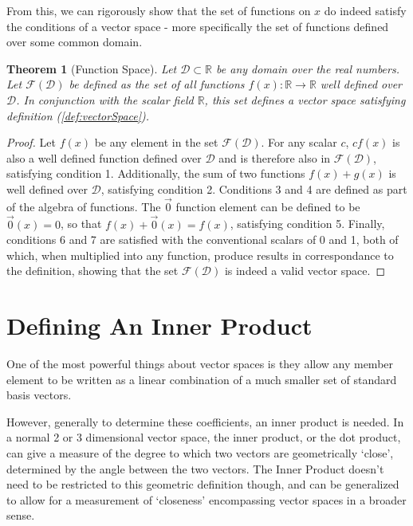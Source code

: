 \documentclass{article}
\newcommand*\R{\mathbb{R}}
\newtheorem{theorem}{Theorem}[section]
\theoremstyle{definition}
\theoremstyle{remark}
\begin{document}
From this, we can rigorously show that the set of functions
on $x$ do indeed satisfy the conditions of a vector space - more 
specifically the set of functions defined over some common domain.

\begin{theorem}[Function Space]
  Let $\mathcal{D} \subset \R$ be any domain over the real numbers. 
  Let $\mathscr{F}(\mathcal{D})$ be defined as the set of all functions $f(x) : \mathbb{R} \to \mathbb{R}$ well defined over $\mathcal{D}$. 
  In conjunction with the scalar field $\R$, this set defines a vector space satisfying definition (\ref{def:vectorSpace}).
\end{theorem}

\begin{proof}
  Let $f(x)$ be any element in the set $\mathscr{F}(\mathcal{D})$. For any scalar $c$, $cf(x)$ is also a well defined function 
  defined over $\mathcal{D}$ and is therefore also in $\mathscr{F}(\mathcal{D})$, satisfying condition 1. Additionally,
  the sum of two functions $f(x) + g(x)$ is well defined over $\mathcal{D}$, satisfying condition 2. 
  Conditions 3 and 4  are defined as part of the algebra of functions.
  The $\vec{0}$ function element can be defined to be $\vec{0}(x) = 0$,
  so that $f(x) + \vec{0}(x) = f(x)$, satisfying condition 5. Finally,
  conditions 6 and 7 are satisfied with the conventional scalars of 0 and 1,
  both of which, when multiplied into any function, produce results in correspondance
  to the definition, showing that the set $\mathscr{F}(\mathcal{D})$ is indeed a valid vector space.

\end{proof}

\section{Defining An Inner Product}
One of the most powerful things about vector spaces is they allow any member element to 
be written as a linear combination of a much smaller set of standard basis vectors.

However, generally to determine these coefficients, an inner product is needed.
In a normal 2 or 3 dimensional vector space, the inner product, or the dot product,
can give a measure of the degree to which two vectors are geometrically `close',
determined by the angle between the two vectors. The Inner Product doesn't need
to be restricted to this geometric definition though, and can be generalized
to allow for a measurement of `closeness' encompassing vector spaces in a broader sense.
\end{document}
